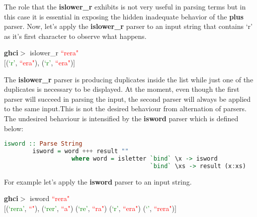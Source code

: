 \documentclass[a4paper, onecolumn]{article}
\begin{document}
    \noindent The role that the \textbf{islower\_r} exhibits is not very useful in parsing terms but in this case it is essential in exposing the hidden inadequate behavior of the \textbf{plus} parser. Now, let's apply the \textbf{islower\_r} parser to an input string that contains `r' as it's first character to observe what happens.
    
    \begin{center}
            \textbf{ghci$>$} islower\_r \textcolor{red}{``rera"} \\
            $\big[$(\textcolor{green}{`r'}, \textcolor{red}{``era"}), (\textcolor{green}{`r'}, \textcolor{red}{``era"})$\big]$
        \end{center}
    
     \noindent The \textbf{islower\_r} parser is producing duplicates inside the list while just one of the duplicates is necessary to be displayed. At the moment, even though the first parser will succeed in parsing the input, the second parser will always be applied to the same input.This is not the desired behaviour from alternation of parsers. The undesired behaviour is intensified by the \textbf{isword} parser which is defined below:
     
    \begin{tcolorbox}
    \begin{lstlisting}[language=Haskell] 
        isword :: Parse String
        isword = word +++ result ""
                   where word = isletter `bind` \x -> isword 
                                         `bind` \xs -> result (x:xs)
    \end{lstlisting}
    \end{tcolorbox}
    
    \noindent For example let's apply the \textbf{isword} parser to an input string.
    
    \begin{center}
            \textbf{ghci$>$} isword \textcolor{red}{``rera"} \\
               $\big[$(\textcolor{green}{`rera'}, \textcolor{red}{``"}), (\textcolor{green}{`rer'}, \textcolor{red}{``a"})
            (\textcolor{green}{`re'}, \textcolor{red}{``ra"})
            (\textcolor{green}{`r'}, \textcolor{red}{``era"})
            (\textcolor{green}{`'}, \textcolor{red}{``rera"})$\big]$
        \end{center}
        
\end{document}
